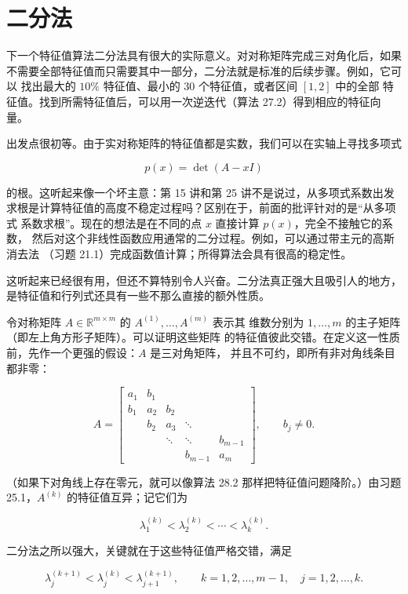 \documentclass[UTF8,fontset=none,12pt]{ctexart}
\begin{document}
\section*{二分法}

下一个特征值算法二分法具有很大的实际意义。对对称矩阵完成三对角化后，如果
不需要全部特征值而只需要其中一部分，二分法就是标准的后续步骤。例如，它可以
找出最大的 $10\%$ 特征值、最小的 30 个特征值，或者区间 $[1,2]$ 中的全部
特征值。找到所需特征值后，可以用一次逆迭代（算法 27.2）得到相应的特征向量。

出发点很初等。由于实对称矩阵的特征值都是实数，我们可以在实轴上寻找多项式

$$
p(x)=\det(A-xI)
$$

的根。这听起来像一个坏主意：第 15 讲和第 25 讲不是说过，从多项式系数出发
求根是计算特征值的高度不稳定过程吗？区别在于，前面的批评针对的是“从多项式
系数求根”。现在的想法是在不同的点 $x$ 直接计算 $p(x)$，完全不接触它的系数，
然后对这个非线性函数应用通常的二分过程。例如，可以通过带主元的高斯消去法
（习题 21.1）完成函数值计算；所得算法会具有很高的稳定性。

这听起来已经很有用，但还不算特别令人兴奋。二分法真正强大且吸引人的地方，
是特征值和行列式还具有一些不那么直接的额外性质。

令对称矩阵 $A\in\mathbb{R}^{m\times m}$ 的 $A^{(1)},\ldots,A^{(m)}$ 表示其
维数分别为 $1,\ldots,m$ 的主子矩阵（即左上角方形子矩阵）。可以证明这些矩阵
的特征值彼此交错。在定义这一性质前，先作一个更强的假设：$A$ 是三对角矩阵，
并且不可约，即所有非对角线条目都非零：

\begin{equation}
A=\begin{bmatrix}
a_1&b_1&&&\\
b_1&a_2&b_2&&\\
&b_2&a_3&\ddots&\\
&&\ddots&\ddots&b_{m-1}\\
&&&b_{m-1}&a_m
\end{bmatrix},
\qquad b_j\ne0.
\tag{30.5}
\end{equation}

（如果下对角线上存在零元，就可以像算法 28.2 那样把特征值问题降阶。）由习题
25.1，$A^{(k)}$ 的特征值互异；记它们为

$$
\lambda_1^{(k)}<\lambda_2^{(k)}<\cdots<\lambda_k^{(k)}.
$$

二分法之所以强大，关键就在于这些特征值严格交错，满足

\begin{equation}
\lambda_j^{(k+1)}<\lambda_j^{(k)}<\lambda_{j+1}^{(k+1)},
\qquad k=1,2,\ldots,m-1,\quad j=1,2,\ldots,k.
\tag{30.6}
\end{equation}
\end{document}
